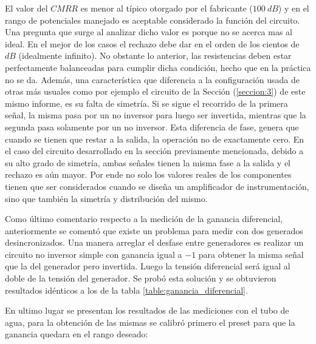 El valor del $CMRR$ es menor al t\'ipico otorgado por el fabricante ($100 \ dB$) y en el rango de potenciales manejado es aceptable considerado la función del circuito. Una pregunta que surge al analizar dicho valor es porque no se acerca mas al ideal. En el mejor de los casos el rechazo debe dar en el orden de los cientos de $dB$ (idealmente infinito). No obstante lo anterior, las resistencias deben estar perfectamente balanceadas para cumplir dicha condici\'on, hecho que en la pr\'actica no se da. Adem\'as, una caracter\'istica que diferencia a la configuraci\'on usada de otras más usuales como por ejemplo el circuito de la Sección (\ref{seccion:3}) de este mismo informe, es su falta de simetría. Si se sigue el recorrido de la primera señal, la misma pasa por un no inversor para luego ser invertida, mientras que la segunda pasa solamente por un no inversor. Esta diferencia de fase, genera que cuando se tienen que restar a la salida, la operaci\'on no de exactamente cero. En el caso del circuito desarrollado en la sección previamente mencionada, debido a su alto grado de simetr\'ia, ambas señales tienen la misma fase a la salida y el rechazo es a\'un mayor. Por ende no solo los valores reales de los componentes tienen que ser considerados cuando se diseña un amplificador de instrumentación, sino que también la simetría y distribución del mismo. 

Como último comentario respecto a la medición de la ganancia diferencial, anteriormente se comentó que existe un problema para medir con dos generados desincronizados. Una manera arreglar el desfase entre generadores es realizar un circuito no inversor simple con ganancia igual a $-1$ para obtener la misma señal que la del generador pero invertida. Luego la tensi\'on diferencial ser\'a igual al doble de la tensi\'on del generador. Se prob\'o esta soluci\'on y se obtuvieron resultados idénticos a los de la tabla \ref{table:ganancia_diferencial}.

En ultimo lugar se presentan los resultados de las mediciones con el tubo de agua, para la obtenci\'on de las mismas se calibr\'o primero el preset para que la ganancia quedara en el rango deseado:

